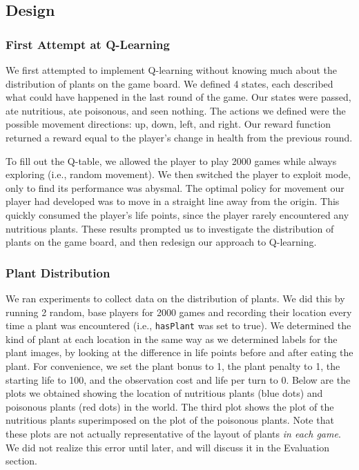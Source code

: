 \documentclass[solution, letterpaper]{cs121}
\begin{document}
\subsection{Design}
\subsubsection{First Attempt at Q-Learning}
\hspace{4mm} We first attempted to implement Q-learning without knowing much about the distribution of plants on the game board. We defined 4 states, each described what could have happened in the last round of the game. Our states were {\sc passed}, {\sc ate nutritious}, {\sc ate poisonous}, and {\sc seen nothing}. The actions we defined were the possible movement directions: {\sc up}, {\sc down}, {\sc left}, and {\sc right}. Our reward function returned a reward equal to the player's change in health from the previous round.

To fill out the Q-table, we allowed the player to play 2000 games while always exploring (i.e., random movement). We then switched the player to exploit mode, only to find its performance was abysmal. The optimal policy for movement our player had developed was to move in a straight line away from the origin. This quickly consumed the player's life points, since the player rarely encountered any nutritious plants. These results prompted us to investigate the distribution of plants on the game board, and then redesign our approach to Q-learning.

\subsubsection{Plant Distribution}
\hspace{4mm} We ran experiments to collect data on the distribution of plants. We did this by running 2 random, base players for 2000 games and recording their location every time a plant was encountered (i.e., {\tt hasPlant} was set to true). We determined the kind of plant at each location in the same way as we determined labels for the plant images, by looking at the difference in life points before and after eating the plant. For convenience, we set the plant bonus to 1, the plant penalty to 1, the starting life to 100, and the observation cost and life per turn to 0. Below are the plots we obtained showing the location of nutritious plants (blue dots) and poisonous plants (red dots) in the world. The third plot shows the plot of the nutritious plants superimposed on the plot of the poisonous plants. Note that these plots are not actually representative of the layout of plants \emph{in each game}. We did not realize this error until later, and will discuss it in the Evaluation section.
\end{document}
